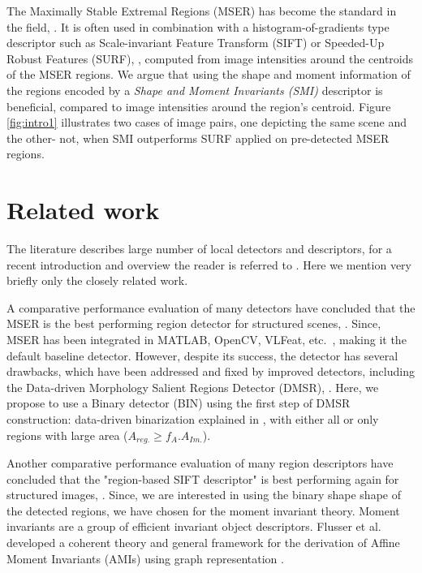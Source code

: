 \documentclass[a4paper,11pt]{article}
\begin{document}
The Maximally Stable Extremal Regions (MSER) has become the standard in the field, \cite{ Matas2002BMVC}. It is often used in combination with a histogram-of-gradients type descriptor such as Scale-invariant Feature Transform (SIFT) or Speeded-Up Robust Features (SURF), \cite{Bay2008}, computed from image intensities around the centroids of the MSER regions. We argue that using the shape and moment information of the  regions encoded by a {\em Shape and Moment Invariants (SMI)} descriptor is beneficial, compared to image intensities around the region's centroid. Figure \ref{fig:intro1} illustrates two cases of image pairs, one depicting the same scene and the other- not, when SMI outperforms SURF applied on pre-detected MSER regions.

\section{Related work}
The literature describes large number of local detectors and descriptors, for a recent introduction and overview the reader is referred to \cite{Hassaballah:2016}. Here we mention very briefly only the closely related work.

A comparative performance evaluation of many detectors have concluded that the MSER is the best performing region detector for structured scenes, \cite{Mikolajczyk:2005}. Since, MSER has been integrated in MATLAB, OpenCV, VLFeat, etc.~, making it the default baseline detector. However, despite its success, the detector has several drawbacks, which have been addressed and fixed by improved detectors, including the Data-driven Morphology Salient Regions Detector (DMSR), \cite{Ranguelova2016AICCSA}. Here, we propose to use a Binary detector (BIN) using the first step of DMSR construction: data-driven binarization explained in \cite{Ranguelova2016AICCSA}, with either all or only regions with large area ($A_{reg.} \ge f_A.A_{Im.}$).

Another comparative performance evaluation of many region descriptors have concluded that the "region-based SIFT descriptor" is best performing again for structured images, \cite{Mikolajczyk:descr:2005}. Since, we are interested in using the binary shape shape of the detected regions, we have chosen for the moment invariant theory. Moment invariants are a group of efficient invariant object descriptors. Flusser et al. developed a coherent theory and general framework for the derivation of Affine Moment Invariants (AMIs) using graph representation \cite{SukF04, Flusser09a}.
\end{document}
